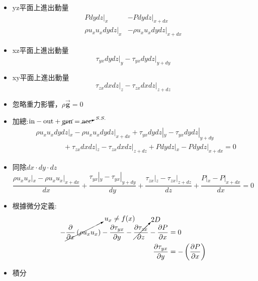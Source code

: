 \documentclass[../main.tex]{subfiles}
\begin{document}
\begin{itemize}
\begin{enumerate}
\begin{itemize}
      \item yz平面上進出動量
      \begin{align}
        P dy dz\big|_{x} & -P dy dz\big|_{x+dx} \nonumber\\
        \rho u_x u_x dy dz\big|_{x} & -\rho u_x u_x dy dz\big|_{x+dx}
      \end{align}
      \item xz平面上進出動量
      \begin{equation}
        \tau_{yx} dy dz\big|_{y} - \tau_{yx} dy dz\big|_{y+dy}
      \end{equation}
      \item xy平面上進出動量
      \begin{equation}
        \tau_{zx} dx dz\big|_{z} - \tau_{zx} dx dz\big|_{z+dz}
      \end{equation}
      \item 忽略重力影響，$\rho \vec {\bm g} = 0$
      \item 加總:$\text{in} -\text{out}+ \cancel{\text{gen}} =\cancelto{S.S.}{\text{acc}}$
      \begin{align}
        &\rho u_x u_x dy dz|_{x} - \rho u_x u_x dy dz|_{x+dx} + 
        \tau_{yx} dy dz|_{y} - \tau_{yx} dy dz|_{y+dy} \nonumber \\
        &\phantom{\tau_{yx} dy dz|_{y}}+ \tau_{zx} dx dz|_{z} - \tau_{zx} dx dz|_{z+dz}  
        + P dy dz|_{x} - P dy dz|_{x+dx} = 0
      \end{align}
      \item 同除$dx\cdot dy\cdot dz$
      \begin{equation}
        \frac{\rho u_x u_x|_{x} - \rho u_x u_x|_{x+dx}}{dx} +
        \frac{\tau_{yx}|_{y} - \tau_{yx}|_{y+dy}}{dy} +
        \frac{\tau_{zx}|_{z} - \tau_{zx}|_{z+dz}}{dz} +
        \frac{P|_{x} - P|_{x+dx}}{dx} = 0 
      \end{equation}
      \item 根據微分定義:
      \begin{align}
        -\cancelto{u_x\neq f(x)}{\frac{\partial}{\partial x}\left(\rho u_x u_x\right)} -
        \frac{\partial \tau_{yx}}{\partial y} - 
        \cancelto{2D}{\frac{\partial \tau_{zx}}{\partial z}} - 
        \frac{\partial P}{\partial x} &= 0 \nonumber \\
         \frac{\partial \tau_{yx}}{\partial y} &= -\left(\frac{\partial P}{\partial x}\right)
      \end{align}
      \item 積分
      \begin{equation}

\end{equation}
\end{itemize}
\end{enumerate}
\end{itemize}
\end{document}
